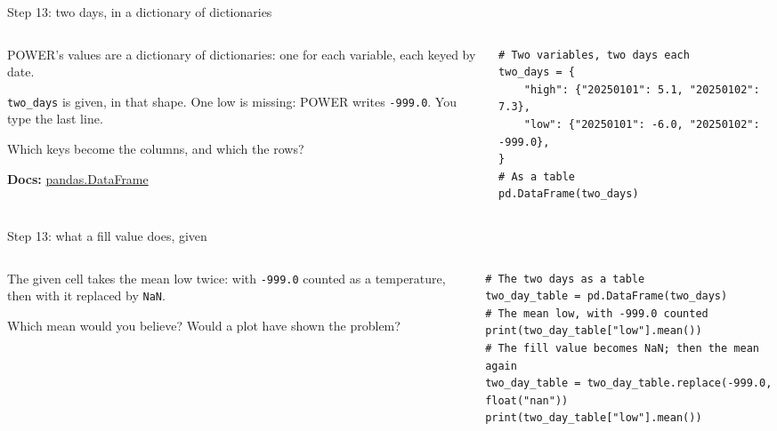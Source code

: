 \documentclass[9pt,aspectratio=169]{beamer}
\begin{document}
\begin{frame}[fragile]{Step 13: two days, in a dictionary of dictionaries}
    \begin{columns}[T]
        \begin{column}{0.37\textwidth}
            POWER's values are a dictionary of dictionaries: one for each variable, each keyed by date.

            \medskip
            \texttt{two\_days} is given, in that shape. One low is missing: POWER writes \texttt{-999.0}. You type the last line.

            \medskip
            Which keys become the columns, and which the rows?

            \medskip
            {\scriptsize\textbf{Docs:} \href{https://pandas.pydata.org/docs/reference/api/pandas.DataFrame.html}{pandas.DataFrame}\par}
        \end{column}
        \begin{column}{0.6\textwidth}
\begin{lstlisting}
# Two variables, two days each
two_days = {
    "high": {"20250101": 5.1, "20250102": 7.3},
    "low": {"20250101": -6.0, "20250102": -999.0},
}
# As a table
pd.DataFrame(two_days)
\end{lstlisting}
        \end{column}
    \end{columns}
\end{frame}

\begin{frame}[fragile]{Step 13: what a fill value does, given}
    \begin{columns}[T]
        \begin{column}{0.37\textwidth}
            The given cell takes the mean low twice: with \texttt{-999.0} counted as a temperature, then with it replaced by \texttt{NaN}.

            \medskip
            Which mean would you believe? Would a plot have shown the problem?
        \end{column}
        \begin{column}{0.6\textwidth}
\begin{lstlisting}
# The two days as a table
two_day_table = pd.DataFrame(two_days)
# The mean low, with -999.0 counted
print(two_day_table["low"].mean())
# The fill value becomes NaN; then the mean again
two_day_table = two_day_table.replace(-999.0, float("nan"))
print(two_day_table["low"].mean())
\end{lstlisting}
        \end{column}
    \end{columns}
\end{frame}
\end{document}
